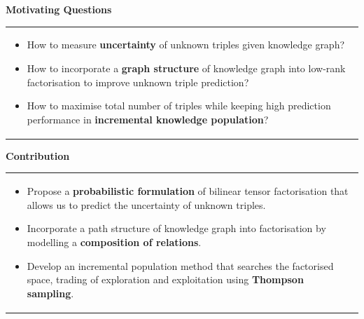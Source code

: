 \documentclass[a0,landscape]{a0poster}
\newcommand{\itemup}{\vspace{-.5cm}}
\begin{document}
\begin{multicols}{3}

\color{DarkSlateGray}

\noindent\textbf{\Large Motivating Questions}

\vspace{.2cm}

\begin{tabular}{p{\linewidth}}
\cellcolor{DarkSlateGray}
\color{white}
\begin{itemize}
\itemup
\item How to measure \textbf{uncertainty} of unknown triples given knowledge graph?
\item How to incorporate a \textbf{graph structure} of knowledge graph into low-rank factorisation to improve unknown triple prediction?
\item How to maximise total number of triples while keeping high prediction performance in \textbf{incremental knowledge population}?
\itemup
\end{itemize}
\end{tabular}

\vspace{.5cm}

\noindent\textbf{\Large Contribution}

\vspace{.2cm}

\begin{tabular}{p{\linewidth}}
\cellcolor{DarkSlateGray}
\color{white}
\begin{itemize}
\itemup
\item Propose a \textbf{probabilistic formulation} of bilinear tensor factorisation that allows us to predict the uncertainty of unknown triples.
\item Incorporate a path structure of knowledge graph into factorisation by modelling a \textbf{composition of relations}.
\item Develop an incremental population method that searches the factorised space, trading of exploration and exploitation using \textbf{Thompson sampling}.
\itemup
\end{itemize}
\end{tabular}



\color{Black}


\end{multicols}
\end{document}
